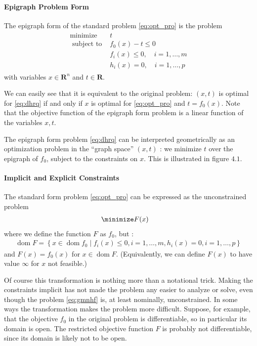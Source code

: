 \documentclass{article}
\begin{document}
\paragraph{Epigraph Problem Form}
The epigraph form of the standard problem \cref{eq:opt_pro} is the problem
\begin{align}
\begin{array}{ll}
\operatorname{minimize} & t \\
\text { subject to } & f_{0}(x)-t \leq 0 \\
& f_{i}(x) \leq 0, \quad i=1, \ldots, m \\
& h_{i}(x)=0, \quad i=1, \ldots, p
\end{array}\label{eq:dhrq}
\end{align}
with variables $x \in \mathbf{R}^{n}$ and $t \in \mathbf{R}$. 

We can easily see that it is equivalent to the original problem: $(x, t)$ is optimal for \cref{eq:dhrq} if and only if $x$ is optimal for \cref{eq:opt_pro} and $t=f_{0}(x)$. Note that the objective function of the epigraph form problem is a linear function of the variables $x, t$.

The epigraph form problem \cref{eq:dhrq} can be interpreted geometrically as an optimization problem in the ``graph space'' $(x, t)$ : we minimize $t$ over the epigraph of $f_{0}$, subject to the constraints on $x$. This is illustrated in figure $4.1$.
\paragraph{Implicit and Explicit Constraints}\label{sec:zlafd}
The standard form problem \cref{eq:opt_pro} can be expressed as the unconstrained problem
\begin{align}
\minimize  &F(x)\label{eq:gmnhf}
\end{align}
where we define the function $F$ as $f_{0}$, but :
\begin{align*}
\operatorname{dom} F=\left\{x \in \operatorname{dom} f_{0} \mid f_{i}(x) \leq 0, i=1, \ldots, m, h_{i}(x)=0, i=1, \ldots, p\right\}
\end{align*}
and $F(x)=f_{0}(x)$ for $x \in \operatorname{dom} F$. (Equivalently, we can define $F(x)$ to have value $\infty$ for $x$ not feasible.) 

Of course this transformation is nothing more than a notational trick. Making the constraints implicit has not made the problem any easier to analyze or solve, even though the problem \cref{eq:gmnhf} is, at least nominally, unconstrained. In some ways the transformation makes the problem more difficult. Suppose, for example, that the objective $f_{0}$ in the original problem is differentiable, so in particular its domain is open. The restricted objective function $F$ is probably not differentiable, since its domain is likely not to be open.
\end{document}
